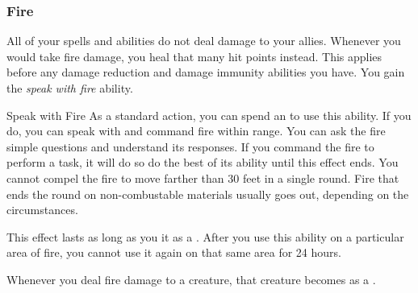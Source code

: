         \subsubsection{Fire}
             All of your  spells and abilities do not deal damage to your allies.
             Whenever you would take fire damage, you heal that many hit points instead.
            This applies before any damage reduction and damage immunity abilities you have.
             You gain the \textit{speak with fire} ability.
            \begin{ability}{Speak with Fire}
                As a standard action, you can spend an  to use this ability.
                If you do, you can speak with and command fire within \rnglong range.
                You can ask the fire simple questions and understand its responses.
                If you command the fire to perform a task, it will do so do the best of its ability until this effect ends.
                You cannot compel the fire to move farther than 30 feet in a single round.
                Fire that ends the round on non-combustable materials usually goes out, depending on the circumstances.

                This effect lasts as long as you  it as a .
                After you use this ability on a particular area of fire, you cannot use it again on that same area for 24 hours.
            \end{ability}
             Whenever you deal fire damage to a creature, that creature becomes \ignited as a .

